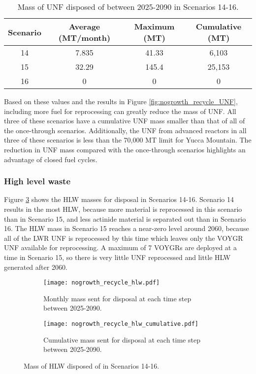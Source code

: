 \begin{table}[h!]
    \centering 
    \caption{Mass of UNF disposed of between 2025-2090 in 
    Scenarios 14-16.}
    \label{tab:s14-16_UNF}
    \begin{tabular}{c c c c}
        \hline 
        Scenario & Average (MT/month) & Maximum (MT) & Cumulative (MT) \\
        \hline
        14 & 7.835 & 41.33 & 6,103\\
        15 & 32.29 & 145.4 & 25,153 \\
        16 & 0 & 0 & 0 \\
        \hline
    \end{tabular}
\end{table}

Based on these values and the results in 
Figure \ref{fig:nogrowth_recycle_UNF}, including more fuel for 
reprocessing can greatly reduce the mass of \gls{UNF}. All three of 
these scenarios have a cumulative \gls{UNF} mass smaller than 
that of all of the once-through scenarios. Additionally, 
the \gls{UNF} from advanced reactors in all three of these scenarios 
is less than the 70,000 MT limit for Yucca Mountain. The reduction in 
\gls{UNF} mass compared with the once-through scenarios highlights 
an advantage of closed fuel cycles. 

\subsubsection{High level waste}
Figure \ref{fig:nogrowth_recycle_hlw} shows the 
\gls{HLW} masses for disposal in Scenarios 14-16. Scenario 
14 results in the most \gls{HLW}, because more 
material is reprocessed in this scenario than in Scenario 15, 
and less actinide material is separated out than in 
Scenario 16. The \gls{HLW} mass in Scenario 15 reaches a 
near-zero level around 2060, because all of the \gls{LWR} 
\gls{UNF} is reprocessed by this time which leaves only
the VOYGR \gls{UNF} available for reprocessing. A 
maximum of 7 VOYGRs are deployed at a time in Scenario 
15, so there is very little \gls{UNF} reprocessed and 
little \gls{HLW} generated after 2060. 

\begin{figure}[h!]
    \centering
    \begin{subfigure}[b]{0.49\textwidth}
        \centering
        \texttt{[image: nogrowth\_recycle\_hlw.pdf]}
        \caption{Monthly mass sent for disposal 
        at each time step between 2025-2090.}
        \label{fig:nogrowth_recycle_hlw_all}
    \end{subfigure}
    \hfill
    \begin{subfigure}[b]{0.49\textwidth}
        \centering
        \texttt{[image: nogrowth\_recycle\_hlw\_cumulative.pdf]}
        \caption{Cumulative mass sent for disposal 
        at each time step between 2025-2090.}
        \label{fig:nogrowth_recycle_hlw_cumulative}
    \end{subfigure}
       \caption{Mass of \gls{HLW} disposed of in Scenarios 14-16.}
       \label{fig:nogrowth_recycle_hlw}
\end{figure}

